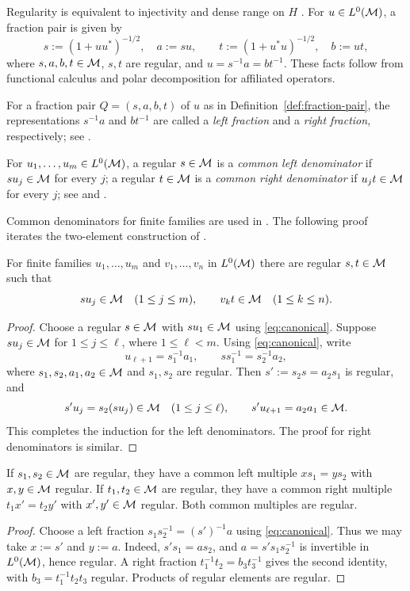 Regularity is equivalent to injectivity and dense range on $H$ \cite[Lemmas 5.1--5.2]{MSY23}.
For $u\in L^0(\mathcal M)$, a fraction pair is given by
\begin{equation}
 s:=(1+uu^*)^{-1/2},\quad a:=su,\qquad
 t:=(1+u^*u)^{-1/2},\quad b:=ut,
 \label{eq:canonical}
\end{equation}
where $s,a,b,t\in\mathcal M$, $s,t$ are regular, and $u=s^{-1}a=bt^{-1}$.
These facts follow from functional calculus and polar decomposition for affiliated operators.

\begin{definition}\label{def:fraction-terminology}
For a fraction pair $Q=(s,a,b,t)$ of $u$ as in Definition~\ref{def:fraction-pair}, the representations $s^{-1}a$ and $bt^{-1}$ are called a \emph{left fraction} and a \emph{right fraction}, respectively; see \cite[Section~8.2.1]{Luc02}.

For $u_1,\ldots,u_m\in L^0(\mathcal M)$, a regular $s\in\mathcal M$ is a \emph{common left denominator} if $su_j\in\mathcal M$ for every $j$; a regular $t\in\mathcal M$ is a \emph{common right denominator} if $u_jt\in\mathcal M$ for every $j$; see \cite[Section~1]{Lin00} and \cite[Lemma~4.1]{Miy22}.
\end{definition}

Common denominators for finite families are used in \cite[Section~1, p.~2 of the arXiv version]{Lin00}.
The following proof iterates the two-element construction of \cite[Lemma~4.1]{Miy22}.

\begin{lemma}\label{lem:clearing}
For finite families $u_1,\ldots,u_m$ and $v_1,\ldots,v_n$ in $L^0(\mathcal M)$ there are regular $s,t\in\mathcal M$ such that
\[
 su_j\in\mathcal M\quad(1\leq j\leq m),\qquad
 v_kt\in\mathcal M\quad(1\leq k\leq n).
\]
\end{lemma}
\begin{proof}
Choose a regular $s\in\mathcal M$ with $su_1\in\mathcal M$ using \eqref{eq:canonical}.
Suppose $su_j\in\mathcal M$ for $1\leq j\leq\ell$, where $1\leq\ell<m$.
Using \eqref{eq:canonical}, write
\[
 u_{\ell+1}=s_1^{-1}a_1,\qquad ss_1^{-1}=s_2^{-1}a_2,
\]
where $s_1,s_2,a_1,a_2\in\mathcal M$ and $s_1,s_2$ are regular.
Then $s':=s_2s=a_2s_1$ is regular, and
\[
 s'u_j=s_2(su_j)\in\mathcal M\quad(1\leq j\leq\ell),\qquad
 s'u_{\ell+1}=a_2a_1\in\mathcal M.
\]
This completes the induction for the left denominators.
The proof for right denominators is similar.
\end{proof}

\begin{lemma}\label{lem:common}
If $s_1,s_2\in\mathcal M$ are regular, they have a common left multiple $xs_1=ys_2$ with $x,y\in\mathcal M$ regular.
If $t_1,t_2\in\mathcal M$ are regular, they have a common right multiple $t_1x'=t_2y'$ with $x',y'\in\mathcal M$ regular.
Both common multiples are regular.
\end{lemma}
\begin{proof}
Choose a left fraction $s_1s_2^{-1}=(s')^{-1}a$ using \eqref{eq:canonical}.
Thus we may take $x:=s'$ and $y:=a$.
Indeed, $s's_1=as_2$, and $a=s's_1s_2^{-1}$ is invertible in $L^0(\mathcal M)$, hence regular.
A right fraction $t_1^{-1}t_2=b_3t_3^{-1}$ gives the second identity, with $b_3=t_1^{-1}t_2t_3$ regular.
Products of regular elements are regular.
\end{proof}


